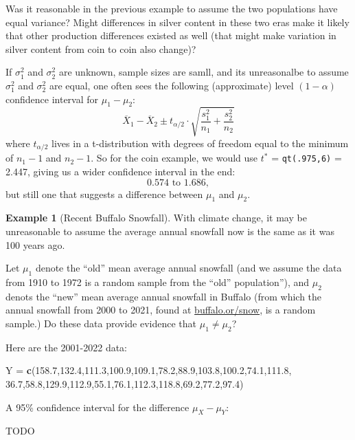 \documentclass[
]{book}
\newenvironment{Shaded}{\begin{snugshade}}{\end{snugshade}}
\newcommand{\FloatTok}[1]{\textcolor[rgb]{0.00,0.00,0.81}{#1}}
\newcommand{\FunctionTok}[1]{\textcolor[rgb]{0.13,0.29,0.53}{\textbf{#1}}}
\newcommand{\NormalTok}[1]{#1}
\newcommand{\OtherTok}[1]{\textcolor[rgb]{0.56,0.35,0.01}{#1}}
\theoremstyle{definition}
\theoremstyle{definition}
\newtheorem{example}{Example}[chapter]
\theoremstyle{definition}
\theoremstyle{definition}
\theoremstyle{remark}
\begin{document}
Was it reasonable in the previous example to assume the two populations have equal variance? Might differences in silver content in these two eras make it likely that other production differences existed as well (that might make variation in silver content from coin to coin also change)?

If \(\sigma_1^2\) and \(\sigma_2^2\) are unknown, sample sizes are samll, and its unreasonalbe to assume \(\sigma_1^2\) and \(\sigma_2^2\) are equal, one often sees the following (approximate) level \((1-\alpha)\) confidence interval for \(\mu_1 - \mu_2\):
\[\overline{X}_1 - \overline{X}_2 \pm t_{\alpha/2} \cdot \sqrt{\frac{s_1^2}{n_1}+\frac{s_2^2}{n_2}}\] where \(t_{\alpha/2}\) lives in a t-distribution with degrees of freedom equal to the minimum of \(n_1 - 1\) and \(n_2 - 1\).
So for the coin example, we would use \(t^*\) = \texttt{qt(.975,6)} = 2.447, giving us a wider confidence interval in the end:
\[0.574 \text{ to } 1.686,\] but still one that suggests a difference between \(\mu_1\) and \(\mu_2\).

\begin{example}[Recent Buffalo Snowfall]
With climate change, it may be unreasonable to assume the average annual snowfall now is the same as it was 100 years ago.

Let \(\mu_1\) denote the ``old'' mean average annual snowfall (and we assume the data from 1910 to 1972 is a random sample from the ``old'' population''), and \(\mu_2\) denots the ``new'' mean average annual snowfall in Buffalo (from which the annual snowfall from 2000 to 2021, found at \href{https://www.buffalo.org/snow}{buffalo.or/snow}, is a random sample.) Do these data provide evidence that \(\mu_1 \neq \mu_2\)?

Here are the 2001-2022 data:

\begin{Shaded}
\begin{Highlighting}[]
\NormalTok{Y }\OtherTok{=} \FunctionTok{c}\NormalTok{(}\FloatTok{158.7}\NormalTok{,}\FloatTok{132.4}\NormalTok{,}\FloatTok{111.3}\NormalTok{,}\FloatTok{100.9}\NormalTok{,}\FloatTok{109.1}\NormalTok{,}\FloatTok{78.2}\NormalTok{,}\FloatTok{88.9}\NormalTok{,}\FloatTok{103.8}\NormalTok{,}\FloatTok{100.2}\NormalTok{,}\FloatTok{74.1}\NormalTok{,}\FloatTok{111.8}\NormalTok{,}
      \FloatTok{36.7}\NormalTok{,}\FloatTok{58.8}\NormalTok{,}\FloatTok{129.9}\NormalTok{,}\FloatTok{112.9}\NormalTok{,}\FloatTok{55.1}\NormalTok{,}\FloatTok{76.1}\NormalTok{,}\FloatTok{112.3}\NormalTok{,}\FloatTok{118.8}\NormalTok{,}\FloatTok{69.2}\NormalTok{,}\FloatTok{77.2}\NormalTok{,}\FloatTok{97.4}\NormalTok{)}
\end{Highlighting}
\end{Shaded}

A 95\% confidence interval for the difference \(\mu_X-\mu_Y\):

TODO
\end{example}
\end{document}
